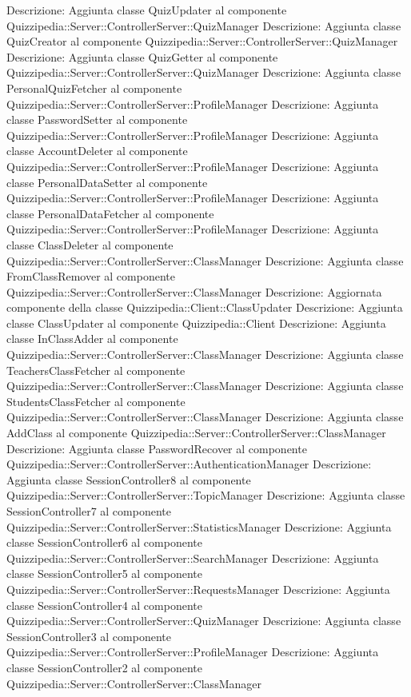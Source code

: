 Descrizione: Aggiunta classe QuizUpdater al componente Quizzipedia::Server::ControllerServer::QuizManager 
Descrizione: Aggiunta classe QuizCreator al componente Quizzipedia::Server::ControllerServer::QuizManager 
Descrizione: Aggiunta classe QuizGetter al componente Quizzipedia::Server::ControllerServer::QuizManager 
Descrizione: Aggiunta classe PersonalQuizFetcher al componente Quizzipedia::Server::ControllerServer::ProfileManager 
Descrizione: Aggiunta classe PasswordSetter al componente Quizzipedia::Server::ControllerServer::ProfileManager 
Descrizione: Aggiunta classe AccountDeleter al componente Quizzipedia::Server::ControllerServer::ProfileManager 
Descrizione: Aggiunta classe PersonalDataSetter al componente Quizzipedia::Server::ControllerServer::ProfileManager 
Descrizione: Aggiunta classe PersonalDataFetcher al componente Quizzipedia::Server::ControllerServer::ProfileManager 
Descrizione: Aggiunta classe ClassDeleter al componente Quizzipedia::Server::ControllerServer::ClassManager 
Descrizione: Aggiunta classe FromClassRemover al componente Quizzipedia::Server::ControllerServer::ClassManager 
Descrizione: Aggiornata componente della classe Quizzipedia::Client::ClassUpdater 
Descrizione: Aggiunta classe ClassUpdater al componente Quizzipedia::Client 
Descrizione: Aggiunta classe InClassAdder al componente Quizzipedia::Server::ControllerServer::ClassManager 
Descrizione: Aggiunta classe TeachersClassFetcher al componente Quizzipedia::Server::ControllerServer::ClassManager 
Descrizione: Aggiunta classe StudentsClassFetcher al componente Quizzipedia::Server::ControllerServer::ClassManager 
Descrizione: Aggiunta classe AddClass al componente Quizzipedia::Server::ControllerServer::ClassManager 
Descrizione: Aggiunta classe PasswordRecover al componente Quizzipedia::Server::ControllerServer::AuthenticationManager 
Descrizione: Aggiunta classe SessionController8 al componente Quizzipedia::Server::ControllerServer::TopicManager 
Descrizione: Aggiunta classe SessionController7 al componente Quizzipedia::Server::ControllerServer::StatisticsManager 
Descrizione: Aggiunta classe SessionController6 al componente Quizzipedia::Server::ControllerServer::SearchManager 
Descrizione: Aggiunta classe SessionController5 al componente Quizzipedia::Server::ControllerServer::RequestsManager 
Descrizione: Aggiunta classe SessionController4 al componente Quizzipedia::Server::ControllerServer::QuizManager 
Descrizione: Aggiunta classe SessionController3 al componente Quizzipedia::Server::ControllerServer::ProfileManager 
Descrizione: Aggiunta classe SessionController2 al componente Quizzipedia::Server::ControllerServer::ClassManager 
